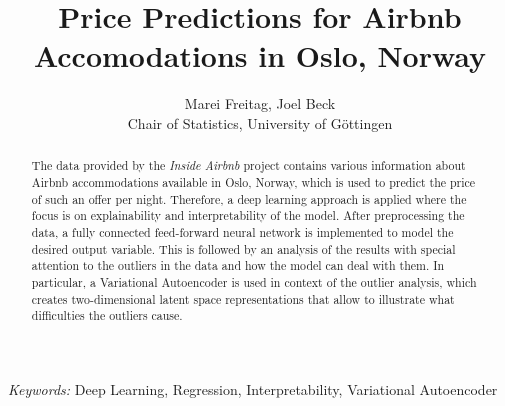 \begin{titlepage}

    \title{\bf Price Predictions for Airbnb Accomodations in Oslo, Norway}

    \author{Marei Freitag, Joel Beck \hspace{.2cm}\\ Chair of Statistics, University of G\"ottingen\\}

    \maketitle

    \bigskip

    \begin{abstract}
        \noindent The data provided by the \emph{Inside Airbnb} project contains various information
        about Airbnb accommodations available in Oslo, Norway, which is used to predict the
        price of such an offer per night. Therefore, a deep learning approach is applied
        where the focus is on explainability and interpretability of the model. After
        preprocessing the data, a fully connected feed-forward neural network is implemented
        to model the desired output variable. This is followed by an analysis of the results
        with special attention to the outliers in the data and how the model can deal with
        them. In particular, a Variational Autoencoder is used in context of the outlier
        analysis, which creates two-dimensional latent space representations that allow to
        illustrate what difficulties the outliers cause.
    \end{abstract}

    \noindent%
    {\it Keywords:}  Deep Learning, Regression, Interpretability, Variational Autoencoder
    \vfill

\end{titlepage}
